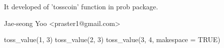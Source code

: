 \documentclass[a4paper]{book}
\begin{document}
%
\begin{Note}\relax
It developed of 'tosscoin' function in prob package.
\end{Note}
%
\begin{Author}\relax
 Jae-seong Yoo <praster1@gmail.com> 
\end{Author}
%
\begin{Examples}
\begin{ExampleCode}
	toss_value(1, 3)
	toss_value(2, 3)
	toss_value(3, 4, makespace = TRUE)
\end{ExampleCode}
\end{Examples}
\printindex{}
\end{document}
